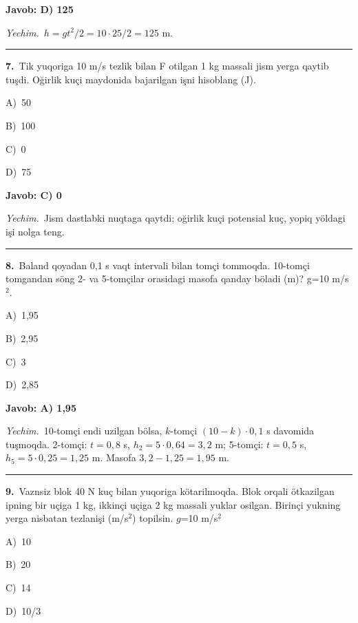 \documentclass[11pt,a4paper]{article}
\newcommand{\opt}[2]{\hspace*{4mm}#1)\ #2\par}
\begin{document}
\noindent\colorbox{gray!12}{\parbox{\dimexpr\linewidth-2\fboxsep}{\textbf{Javob: D) 125}}}\par\smallskip
\noindent\textit{Yechim.}\ $h=gt^2/2=10\cdot25/2=125$ m.\par\par\medskip\hrule\medskip
{}\noindent\begin{minipage}{\linewidth}
\textbf{7.}\ Tik yuqoriga 10 m/s tezlik bilan F otilgan 1 kg massali jism yerga qaytib tuşdi. Oğirlik kuçi maydonida bajarilgan işni hisoblang (J).\par\smallskip
\opt{A}{50}
\opt{B}{100}
\opt{C}{0}
\opt{D}{75}
\end{minipage}\vspace{2pt}\par
\noindent\colorbox{gray!12}{\parbox{\dimexpr\linewidth-2\fboxsep}{\textbf{Javob: C) 0}}}\par\smallskip
\noindent\textit{Yechim.}\ Jism dastlabki nuqtaga qaytdi; oğirlik kuçi potensial kuç, yopiq yöldagi işi nolga teng.\par\par\medskip\hrule\medskip
{}\noindent\begin{minipage}{\linewidth}
\textbf{8.}\ Baland qoyadan 0,1 s vaqt intervali bilan tomçi tommoqda. 10-tomçi tomgandan söng 2- va 5-tomçilar orasidagi masofa qanday böladi (m)? g=10 m/s$^{2}$.\par\smallskip
\opt{A}{1,95}
\opt{B}{2,95}
\opt{C}{3}
\opt{D}{2,85}
\end{minipage}\vspace{2pt}\par
\noindent\colorbox{gray!12}{\parbox{\dimexpr\linewidth-2\fboxsep}{\textbf{Javob: A) 1,95}}}\par\smallskip
\noindent\textit{Yechim.}\ 10-tomçi endi uzilgan bölsa, $k$-tomçi $(10-k)\cdot0{,}1$ s davomida tuşmoqda. 2-tomçi: $t=0{,}8$ s, $h_2=5\cdot0{,}64=3{,}2$ m; 5-tomçi: $t=0{,}5$ s, $h_5=5\cdot0{,}25=1{,}25$ m. Masofa $3{,}2-1{,}25=1{,}95$ m.\par\par\medskip\hrule\medskip
{}\noindent\begin{minipage}{\linewidth}
\textbf{9.}\ Vaznsiz blok 40 N kuç bilan yuqoriga kötarilmoqda. Blok orqali ötkazilgan ipning bir uçiga 1 kg, ikkinçi uçiga 2 kg massali yuklar osilgan. Birinçi yukning yerga nisbatan tezlanişi (m/s$^{2}$) topilsin. $g$=10 m/s$^{2}$\par\smallskip
\opt{A}{10}
\opt{B}{20}
\opt{C}{14}
\opt{D}{10/3}
\end{minipage}\vspace{2pt}\par
\end{document}
